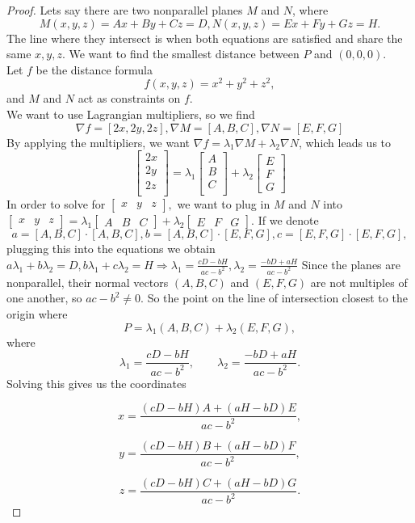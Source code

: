 \documentclass{article}
\begin{document}
\begin{proof}
     Lets say there are two nonparallel planes $M$ and $N$, where $$M(x,y,z)=Ax+By+Cz=D, N(x,y,z)=Ex+Fy+Gz=H.$$ The line where they intersect is when both equations are satisfied and share the same $x,y,z$. We want to find the smallest distance between $P$ and $(0,0,0).$\\
     Let $f$ be the distance formula $$f(x,y,z)=x^2+y^2+z^2,$$ and $M$ and $N$ act as constraints on $f.$\\
     We want to use Lagrangian multipliers, so we find $$\nabla f=[2x, 2y, 2z], \nabla M =[A, B, C], \nabla N=[E,F,G]$$
     By applying the multipliers, we want
     $ \nabla f = \lambda_1 \nabla M + \lambda_2\nabla N$, which leads us to 
     $$\begin{bmatrix}
         2x \\
         2y \\
         2z \\
 \end{bmatrix} =\lambda_1 \begin{bmatrix}
         A \\
         B \\
         C \\
     \end{bmatrix}+\lambda_2\begin{bmatrix}
         E \\
         F\\
         G
     \end{bmatrix}$$
     In order to solve for $\begin{bmatrix}
         x & y &z
     \end{bmatrix},$ we want to plug in $M$ and $N$ into $\begin{bmatrix}
         x & y & z
     \end{bmatrix}=\lambda_1 \begin{bmatrix}
         A & B & C
     \end{bmatrix} + \lambda_2 \begin{bmatrix}
         E & F & G
     \end{bmatrix}. $
     If we denote $$a = [A,B,C] \cdot [A, B, C], b =[A,B,C]\cdot [E,F,G], c=[E,F,G]\cdot [E,F,G], $$
     plugging this into the equations we obtain $a\lambda_1+b\lambda_2=D, b\lambda_1+c\lambda_2=H\Rightarrow \lambda_1=\frac{cD-bH}{ac-b^2}, \lambda_2=\frac{-bD+aH}{ac-b^2}$
     Since the planes are nonparallel, their normal vectors $(A,B,C)$ and $(E,F,G)$ are not multiples of one another, so $ac-b^2 \neq 0$.
     So the point on the line of intersection closest to the origin where
     $$
     P
     =
     \lambda_1(A,B,C)
     +
     \lambda_2(E,F,G),
     $$
     where
     $$
     \lambda_1=\frac{cD-bH}{ac-b^2}, 
     \qquad 
     \lambda_2=\frac{-bD+aH}{ac-b^2}.
     $$
     Solving this gives us the coordinates 
    
    \[
    x
    =
    \frac{
    (cD - bH)A + (aH - bD)E
    }{ac - b^2},
    \]
    
    \[
    y
    =
    \frac{
    (cD - bH)B + (aH - bD)F
    }{ac - b^2},
    \]
    
    \[
    z
    =
    \frac{
    (cD - bH)C + (aH - bD)G
    }{ac - b^2}.
    \]
\end{proof} 
\end{document}
